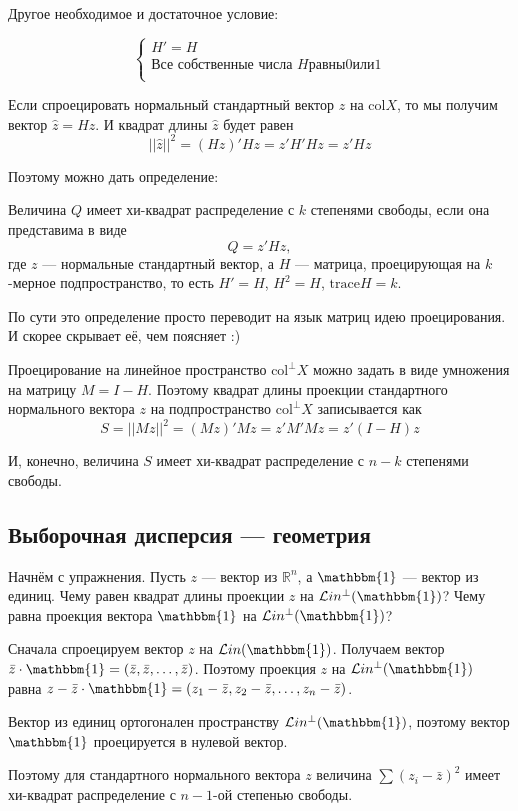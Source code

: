 \documentclass[11pt,russian,]{article}
\newcommand{\RR}{\mathbb{R}}
\renewcommand{\Rn}{\RR^n}
\newcommand{\1}{\mathbbm{1}}
\newcommand{\Lin}{\mathcal{L}in}
\newcommand{\Linp}{\Lin^{\perp}}
\newcommand{\col}{\mathcal{col}}
\newcommand{\colp}{\col^{\perp}}
\renewcommand{\col}{\mathrm{col}}
\newcommand{\trace}{\mathrm{trace}}
\begin{document}
Другое необходимое и достаточное условие:

\[
\begin{cases}
H' = H \\
\text{Все собственные числа } H { равны } 0 { или } 1\\
\end{cases}
\]

Если спроецировать нормальный стандартный вектор \(z\) на \(\col X\), то
мы получим вектор \(\hat z = Hz\). И квадрат длины \(\hat z\) будет
равен \[
||\hat z ||^2 = (Hz)'Hz=z'H'Hz = z'Hz
\]

Поэтому можно дать определение:

Величина \(Q\) имеет хи-квадрат распределение с \(k\) степенями свободы,
если она представима в виде \[
Q = z'Hz,
\] где \(z\) --- нормальные стандартный вектор, а \(H\) --- матрица,
проецирующая на \(k\)-мерное подпространство, то есть \(H'=H\),
\(H^2=H\), \(\trace H = k\).

По сути это определение просто переводит на язык матриц идею
проецирования. И скорее скрывает её, чем поясняет :)

Проецирование на линейное пространство \(\colp X\) можно задать в виде
умножения на матрицу \(M = I - H\). Поэтому квадрат длины проекции
стандартного нормального вектора \(z\) на подпространство \(\colp X\)
записывается как \[
S = ||Mz||^2 = (Mz)'Mz=z'M'Mz=z'(I-H)z
\]

И, конечно, величина \(S\) имеет хи-квадрат распределение с \(n-k\)
степенями свободы.

\subsection{Выборочная дисперсия --- геометрия}\label{--}

Начнём с упражнения. Пусть \(z\) --- вектор из \(\Rn\), а \(\1\) ---
вектор из единиц. Чему равен квадрат длины проекции \(z\) на
\(\Linp(\1)\)? Чему равна проекция вектора \(\1\) на \(\Linp(\1)\)?

Сначала спроецируем вектор \(z\) на \(\Lin(\1)\). Получаем вектор
\(\bar z \cdot \1 = (\bar z, \bar z, \ldots, \bar z)\). Поэтому проекция
\(z\) на \(\Linp(\1)\) равна
\(z - \bar z \cdot \1 = (z_1 - \bar z, z_2 - \bar z, \ldots, z_n - \bar z)\).

Вектор из единиц ортогонален пространству \(\Linp(\1)\), поэтому вектор
\(\1\) проецируется в нулевой вектор.

Поэтому для стандартного нормального вектора \(z\) величина
\(\sum (z_i - \bar z)^2\) имеет хи-квадрат распределение с \(n-1\)-ой
степенью свободы.
\end{document}
